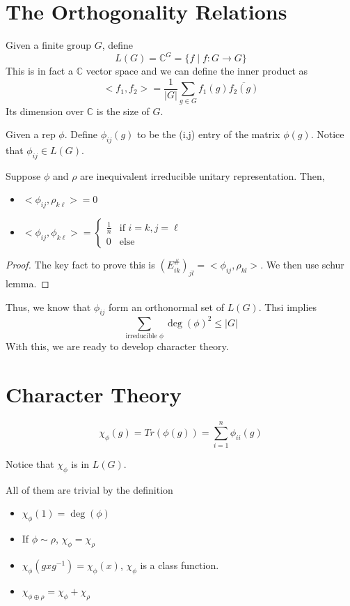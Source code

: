 \documentclass[15pt]{scrartcl}
\newcommand{\C}{\mathbb{C}}
\begin{document}
\section{The Orthogonality Relations}
\begin{definition}
Given a finite group $G$, define 
\[L(G)=\C^G=\{f\mid f:  G\to G\}\]
This is in fact a $\C$ vector space and we can define the inner product as \[<f_1, f_2>=\frac{1}{|G|}\sum_{g\in G}f_1(g)\overline{f_2(g)}\]
Its dimension over $\C$ is the size of $G$. 
\end{definition}
\begin{definition}
Given a rep $\phi$. Define $\phi_{ij}(g)$ to be the (i,j) entry of the matrix $\phi(g)$. Notice that $\phi_{ij}\in L(G)$. 
\end{definition}
\begin{theorem}

Suppose $\phi$ and $\rho$ are inequivalent irreducible unitary representation. Then, 
\begin{itemize}
\item $<\phi_{ij},\rho_{k\ell}>=0$
\item $<\phi_{ij},\phi_{k\ell}>= 
\begin{cases}
    \frac 1n & \text{if } i=k, j=\ell \\
    0 & \text{else}
    \end{cases}
$
\end{itemize}

\end{theorem}

\begin{proof}
The key fact to prove this is $(E_{ik}^\#)_{jl}=<\phi_{ij},\rho_{kl}>$. We then use schur lemma. 
\end{proof}
Thus, we know that $\phi_{ij}$ form an orthonormal set of $L(G)$. Thsi implies
\[\sum_{\text{irreducible } \phi}\deg(\phi)^2\leq |G|\]
With this, we are ready to develop character theory. 
\section{Character Theory}
\begin{definition}
\[\chi_{\phi}(g)=Tr(\phi(g))=\sum_{i=1}^n\phi_{ii}(g)\]
\end{definition}
Notice that $\chi_\phi$ is in $L(G)$.
\begin{proposition}
All of them are trivial by the definition
\begin{itemize}

\item $\chi_\phi(1)=\deg(\phi)$
\item If $\phi \sim \rho$, $\chi_\phi=\chi_\rho$
\item $\chi_\phi(gxg^{-1})=\chi_\phi(x)$, $\chi_\phi$ is a class function. 
\item $\chi_{\phi\oplus\rho}=\chi_{\phi}+\chi_{\rho}$
\end{itemize}
\end{proposition}
\end{document}
